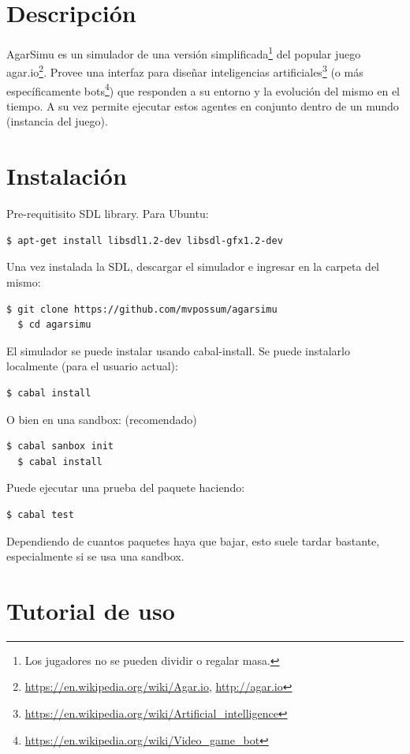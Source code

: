 \documentclass[12pt]{article}
\begin{document}
\section{Descripción}
AgarSimu es un simulador de una versión simplificada\footnote{Los jugadores no se pueden dividir o regalar masa.} del popular juego agar.io\footnote{\url{https://en.wikipedia.org/wiki/Agar.io}, \url{http://agar.io}}. Provee una interfaz para diseñar inteligencias artificiales\footnote{\url{https://en.wikipedia.org/wiki/Artificial_intelligence}} (o más específicamente bots\footnote{\url{https://en.wikipedia.org/wiki/Video_game_bot}}) que responden a su entorno y la evolución del mismo en el tiempo. A su vez permite ejecutar estos agentes en conjunto dentro de un mundo (instancia del juego).
\section{Instalación}
Pre-requitisito SDL library. Para Ubuntu:
\begin{lstlisting}[language=bash]
  $ apt-get install libsdl1.2-dev libsdl-gfx1.2-dev
\end{lstlisting}

Una vez instalada la SDL, descargar el simulador e ingresar en la carpeta del mismo:

\begin{lstlisting}[language=bash]
  $ git clone https://github.com/mvpossum/agarsimu
  $ cd agarsimu
\end{lstlisting}

El simulador se puede instalar usando cabal-install. Se puede instalarlo localmente (para el usuario actual):

\begin{lstlisting}[language=bash]
  $ cabal install
\end{lstlisting}

O bien en una sandbox: (recomendado)
\begin{lstlisting}[language=bash]
  $ cabal sanbox init
  $ cabal install
\end{lstlisting}

Puede ejecutar una prueba del paquete haciendo:
\begin{lstlisting}[language=bash]
  $ cabal test
\end{lstlisting}

Dependiendo de cuantos paquetes haya que bajar, esto suele tardar bastante, especialmente si se usa una sandbox.
\section{Tutorial de uso}
\end{document}
